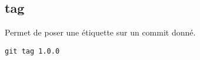 \subsection*{tag}
Permet de poser une étiquette sur un commit donné.
\begin{verbatim}
git tag 1.0.0
\end{verbatim}

